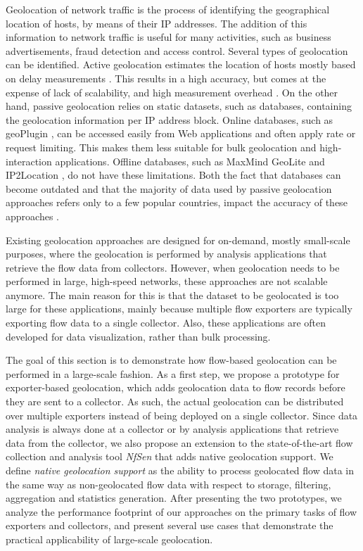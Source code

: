 Geolocation of network traffic is the process of identifying the geographical location of hosts, by means of their IP addresses. The addition of this information to network traffic is useful for many activities, such as business advertisements, fraud detection and access control. Several types of geolocation can be identified. Active geolocation estimates the location of hosts mostly based on delay measurements \cite{Katz-Bassett-2006-Towards, Eriksson-2010-Learning}. This results in a high accuracy, but comes at the expense of lack of scalability, and high measurement overhead \cite{Poese-2011-IP}. On the other hand, passive geolocation relies on static datasets, such as databases, containing the geolocation information per IP address block. Online databases, such as geoPlugin \cite{--geoPlugin}, can be accessed easily from Web applications and often apply rate or request limiting. This makes them less suitable for bulk geolocation and high-interaction applications. Offline databases, such as MaxMind GeoLite \cite{MaxMind--GeoLite} and IP2Location \cite{IP2Location--IP}, do not have these limitations. Both the fact that databases can become outdated and that the majority of data used by passive geolocation approaches refers only to a few popular countries, impact the accuracy of these approaches \cite{Poese-2011-IP}.
 
Existing geolocation approaches are designed for on-demand, mostly small-scale purposes, where the geolocation is performed by analysis applications that retrieve the flow data from collectors. However, when geolocation needs to be performed in large, high-speed networks, these approaches are not scalable anymore. The main reason for this is that the dataset to be geolocated is too large for these applications, mainly because multiple flow exporters are typically exporting flow data to a single collector. Also, these applications are often developed for data visualization, rather than bulk processing.

The goal of this section is to demonstrate how flow-based geolocation can be performed in a large-scale fashion. As a first step, we propose a prototype for exporter-based geolocation, which adds geolocation data to flow records before they are sent to a collector. As such, the actual geolocation can be distributed over multiple exporters instead of being deployed on a single collector. Since data analysis is always done at a collector or by analysis applications that retrieve data from the collector, we also propose an extension to the state-of-the-art flow collection and analysis tool \textit{NfSen} \cite{Haag-2011-NfSen} that adds native geolocation support. We define \textit{native geolocation support} as the ability to process geolocated flow data in the same way as non-geolocated flow data with respect to storage, filtering, aggregation and statistics generation. After presenting the two prototypes, we analyze the performance footprint of our approaches on the primary tasks of flow exporters and collectors, and present several use cases that demonstrate the practical applicability of large-scale geolocation.

